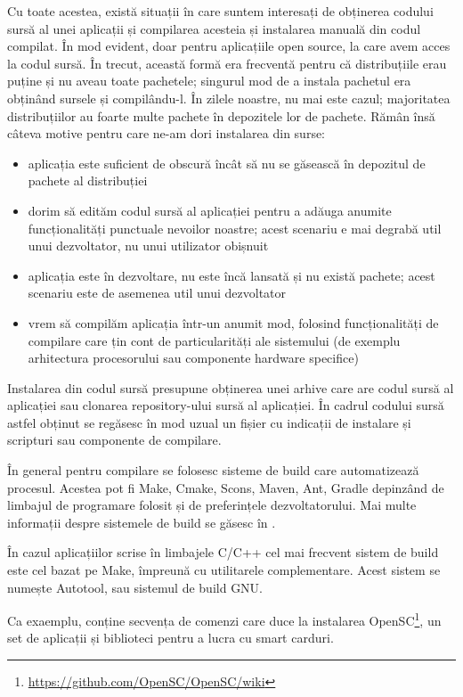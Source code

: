 Cu toate acestea, există situații în care suntem interesați de obținerea codului sursă al unei aplicații și compilarea acesteia și instalarea manuală din codul compilat. În mod evident, doar pentru aplicațiile open source, la care avem acces la codul sursă. În trecut, această formă era frecventă pentru că distribuțiile erau puține și nu aveau toate pachetele; singurul mod de a instala pachetul era obținând sursele și compilându-l. În zilele noastre, nu mai este cazul; majoritatea distribuțiilor au foarte multe pachete în depozitele lor de pachete. Rămân însă câteva motive pentru care ne-am dori instalarea din surse:

\begin{itemize}
  \item aplicația este suficient de obscură încât să nu se găsească în depozitul de pachete al distribuției
  \item dorim să edităm codul sursă al aplicației pentru a adăuga anumite funcționalități punctuale nevoilor noastre; acest scenariu e mai degrabă util unui dezvoltator, nu unui utilizator obișnuit
  \item aplicația este în dezvoltare, nu este încă lansată și nu există pachete; acest scenariu este de asemenea util unui dezvoltator
  \item vrem să compilăm aplicația într-un anumit mod, folosind funcționalități de compilare care țin cont de particularități ale sistemului (de exemplu arhitectura procesorului sau componente hardware specifice)
\end{itemize}

Instalarea din codul sursă presupune obținerea unei arhive care are codul sursă al aplicației sau clonarea repository-ului sursă al aplicației. În cadrul codului sursă astfel obținut se regăsesc în mod uzual un fișier  cu indicații de instalare și scripturi sau componente de compilare.

În general pentru compilare se folosesc sisteme de build care automatizează procesul. Acestea pot fi Make, Cmake, Scons, Maven, Ant, Gradle depinzând de limbajul de programare folosit și de preferințele dezvoltatorului. Mai multe informații despre sistemele de build se găsesc în .

În cazul aplicațiilor scrise în limbajele C/C++ cel mai frecvent sistem de build este cel bazat pe Make, împreună cu utilitarele complementare. Acest sistem se numește Autotool, sau sistemul de build GNU.

Ca exaemplu,  conține secvența de comenzi care duce la instalarea OpenSC\footnote{\url{https://github.com/OpenSC/OpenSC/wiki}}, un set de aplicații și biblioteci pentru a lucra cu smart carduri.

